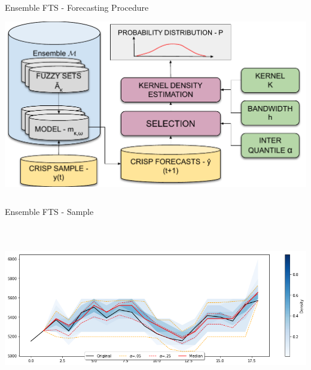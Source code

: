\documentclass{beamer}
\begin{document}


\begin{frame}{Ensemble FTS - Forecasting Procedure}
\includegraphics[width=\textwidth,height=8cm]{figures/ensemblefts_forecasting.pdf}
\end{frame}



\begin{frame}{Ensemble FTS - Sample}
\includegraphics[width=\textwidth,height=8cm]{figures/ensemblefts_sample_onestep.png}
\end{frame}

\note[itemize]{
\item 
}
\end{document}
